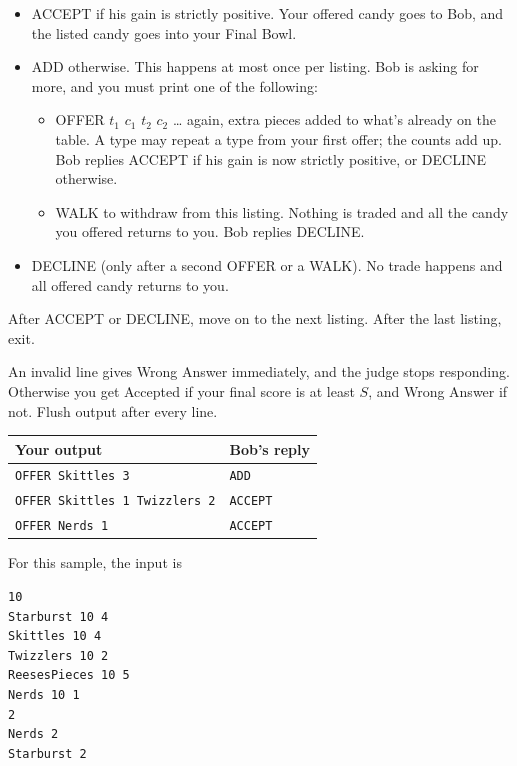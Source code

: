 \documentclass[11pt]{article}
\begin{document}
\begin{itemize}
  \item ACCEPT if his gain is strictly positive. Your offered candy goes to
        Bob, and the listed candy goes into your Final Bowl.
  \item ADD otherwise. This happens at most once per listing. Bob is asking for
        more, and you must print one of the following:
        \begin{itemize}
          \item OFFER $t_1$ $c_1$ $t_2$ $c_2$ \ldots{} again, extra pieces added
                to what's already on the table. A type may repeat a type from
                your first offer; the counts add up. Bob replies ACCEPT if his
                gain is now strictly positive, or DECLINE otherwise.
          \item WALK to withdraw from this listing. Nothing is traded and all
                the candy you offered returns to you. Bob replies DECLINE.
        \end{itemize}
  \item DECLINE (only after a second OFFER or a WALK). No trade happens and all
        offered candy returns to you.
\end{itemize}

After ACCEPT or DECLINE, move on to the next listing. After the last listing,
exit.

An invalid line gives Wrong Answer immediately, and the judge stops responding.
Otherwise you get Accepted if your final score is at least $S$, and Wrong Answer
if not. Flush output after every line.


\begin{table}[h]
\centering
\begin{tabular}{l|l}
\textbf{Your output} & \textbf{Bob's reply} \\
\hline
\texttt{OFFER Skittles 3} & \texttt{ADD} \\
\texttt{OFFER Skittles 1 Twizzlers 2} & \texttt{ACCEPT} \\
\texttt{OFFER Nerds 1} & \texttt{ACCEPT} \\
\end{tabular}
\end{table}

For this sample, the input is

\begin{verbatim}
10
Starburst 10 4
Skittles 10 4
Twizzlers 10 2
ReesesPieces 10 5
Nerds 10 1
2
Nerds 2
Starburst 2
\end{verbatim}
\end{document}
